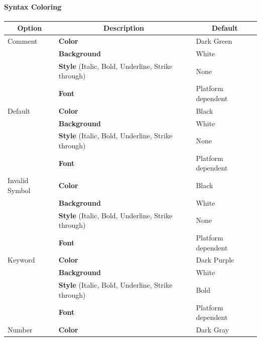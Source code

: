 \paragraph{Syntax Coloring}
\begin{table}[!htbp]
  \centering
  \begin{tabular}{|p{}|p{}|p{}|}
    \hline
    \multicolumn{1}{|c}{\textbf{Option}} & \multicolumn{1}{|c}{\textbf{Description}} &%
                                                                                       \multicolumn{1}{|c|}{\textbf{Default}} \\
    \hline
    Comment & \textbf{Color} & Dark Green \\
                                         & \textbf{Background} & White \\
                                         & \textbf{Style} (Italic, Bold, Underline, Strike through) & None \\
                                         & \textbf{Font} & Platform dependent \\
    \hline
    Default & \textbf{Color} & Black \\
                                         & \textbf{Background} & White \\
                                         & \textbf{Style} (Italic, Bold, Underline, Strike through) & None \\
                                         & \textbf{Font} & Platform dependent \\
    \hline
    Invalid Symbol & \textbf{Color} & Black \\
                                         & \textbf{Background} & White \\
                                         & \textbf{Style} (Italic, Bold, Underline, Strike through) & None \\
                                         & \textbf{Font} & Platform dependent \\
    \hline
    Keyword & \textbf{Color} & Dark Purple \\
                                         & \textbf{Background} & White \\
                                         & \textbf{Style} (Italic, Bold, Underline, Strike through) & Bold \\
                                         & \textbf{Font} & Platform dependent \\
    \hline
    Number & \textbf{Color} & Dark Gray \\

\end{tabular}
\end{table}
